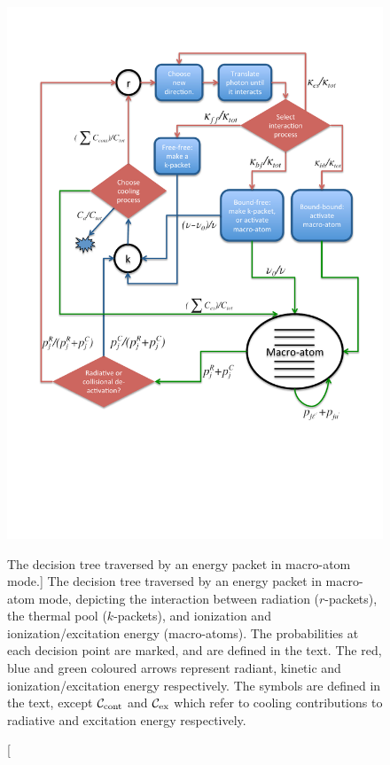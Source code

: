 \begin{figure}
\centering
\includegraphics[width=1.0\textwidth, clip=true, trim=0 2.6in 0in 0in ]{figures/03-radtrans/matom_flow_ca.pdf}
\caption
[The decision tree traversed by an energy packet 
in macro-atom mode.]
{
The decision tree traversed by an energy packet 
in macro-atom mode, depicting the interaction
between radiation ($r$-packets), the thermal pool ($k$-packets), and ionization
and ionization/excitation energy (macro-atoms). 
The probabilities at each decision point are 
marked, and are defined in the text. The red, blue and green coloured arrows
represent radiant, kinetic and ionization/excitation energy respectively.
The symbols are defined in the text, except ${\cal C}_{\mathrm{cont}}$ and 
${\cal C}_{\mathrm{ex}}$ which refer to cooling contributions to radiative and excitation 
energy respectively.
} 
\label{fig:flow_matom}
\end{figure}

